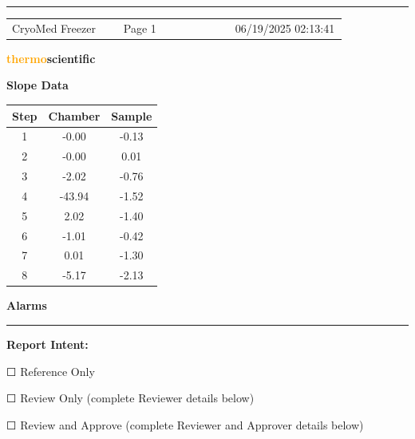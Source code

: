 \documentclass[UTF8,10pt,a4paper,fontset=fandol]{ctexart}
\newcommand{\fieldvalue}[1]{#1}
\newcommand{\checkboxfield}[1]{\ifstrequal{#1}{checked}{☑}{\ifstrequal{#1}{unclear}{?}{☐}}}
\begin{document}
\vfill

\rule{\linewidth}{0.4pt}

\begin{tabular}{@{}p{0.33\linewidth}p{0.33\linewidth}p{0.33\linewidth}@{}}
CryoMed Freezer & Page 1 & 06/19/2025 02:13:41
\end{tabular}

\newpage

\begin{center}
\textcolor{orange}{\textbf{thermo}}\textbf{scientific}
\end{center}

\vspace{1em}

\noindent
\begin{minipage}[t]{0.35\linewidth}
\centering
\textbf{Slope Data}

\smallskip
\begin{tabular}{c c c}
\hline
Step & Chamber & Sample \\
\hline
1 & -0.00 & -0.13 \\
2 & -0.00 & 0.01 \\
3 & -2.02 & -0.76 \\
4 & -43.94 & -1.52 \\
5 & 2.02 & -1.40 \\
6 & -1.01 & -0.42 \\
7 & 0.01 & -1.30 \\
8 & -5.17 & -2.13 \\
\end{tabular}
\end{minipage}
\hfill
\begin{minipage}[t]{0.50\linewidth}
\centering
\textbf{Alarms}

\vspace{0.7em}
\rule{\linewidth}{0.4pt}
\end{minipage}

\vspace{1.5em}

\noindent\textbf{Report Intent:}

\noindent
\fieldvalue{\checkboxfield{unchecked}} Reference Only

\noindent
\fieldvalue{\checkboxfield{unchecked}} Review Only (complete Reviewer details below)

\noindent
\fieldvalue{\checkboxfield{unchecked}} Review and Approve (complete Reviewer and Approver details below)
\end{document}
